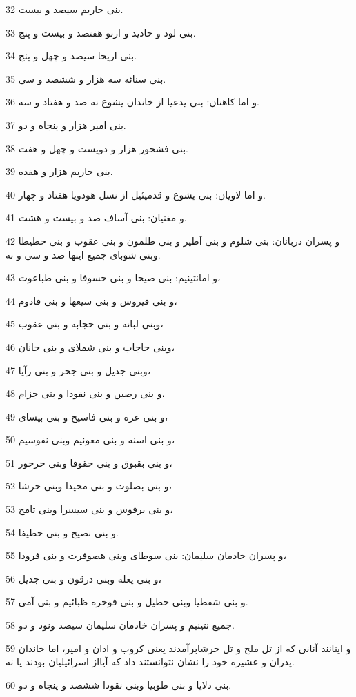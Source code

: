 \par 32 بنی حاریم سیصد و بیست.
\par 33 بنی لود و حادید و ارنو هفتصد و بیست و پنج.
\par 34 بنی اریحا سیصد و چهل و پنج.
\par 35 بنی سنائه سه هزار و ششصد و سی.
\par 36 و اما کاهنان: بنی یدعیا از خاندان یشوع نه صد و هفتاد و سه.
\par 37 بنی امیر هزار و پنجاه و دو.
\par 38 بنی فشحور هزار و دویست و چهل و هفت.
\par 39 بنی حاریم هزار و هفده.
\par 40 و اما لاویان: بنی یشوع و قدمیئیل از نسل هودویا هفتاد و چهار.
\par 41 و مغنیان: بنی آساف صد و بیست و هشت.
\par 42 و پسران دربانان: بنی شلوم و بنی آطیر و بنی طلمون و بنی عقوب و بنی حطیطا وبنی شوبای جمیع اینها صد و سی و نه.
\par 43 و امانتینیم: بنی صیحا و بنی حسوفا و بنی طباعوت،
\par 44 و بنی قیروس و بنی سیعها و بنی فادوم،
\par 45 وبنی لبانه و بنی حجابه و بنی عقوب،
\par 46 وبنی حاجاب و بنی شملای و بنی حانان،
\par 47 وبنی جدیل و بنی جحر و بنی رآیا،
\par 48 و بنی رصین و بنی نقودا و بنی جزام،
\par 49 و بنی عزه و بنی فاسیح و بنی بیسای،
\par 50 و بنی اسنه و بنی معونیم وبنی نفوسیم،
\par 51 و بنی بقبوق و بنی حقوفا وبنی حرحور،
\par 52 و بنی بصلوت و بنی محیدا وبنی حرشا،
\par 53 و بنی برقوس و بنی سیسرا وبنی تامح،
\par 54 و بنی نصیح و بنی حطیفا.
\par 55 و پسران خادمان سلیمان: بنی سوطای وبنی هصوفرت و بنی فرودا،
\par 56 و بنی یعله وبنی درقون و بنی جدیل،
\par 57 و بنی شفطیا وبنی حطیل و بنی فوخره ظبائیم و بنی آمی.
\par 58 جمیع نتینیم و پسران خادمان سلیمان سیصد ونود و دو.
\par 59 و اینانند آنانی که از تل ملح و تل حرشابرآمدند یعنی کروب و ادان و امیر، اما خاندان پدران و عشیره خود را نشان نتوانستند داد که آیااز اسرائیلیان بودند یا نه.
\par 60 بنی دلایا و بنی طوبیا وبنی نقودا ششصد و پنجاه و دو.
